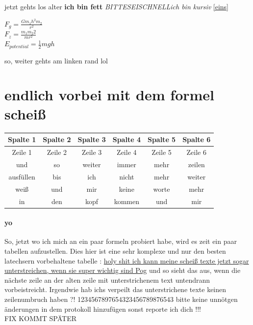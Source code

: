 \documentclass[a4paper]{scrartcl}
\begin{document}
				jetzt gehts los alter \textbf{ich bin fett}
				\emph{BITTESEISCHNELL}\textit{ich bin kursiv}
				\ref{eins}
				\linebreak[3]
				\\ \begin{center} \huge ${F}_{g}=\frac{G{m}_{1}h^2{m}_{2}}{{r}^{2}}$
				\linebreak[5]
				\\ {\color{red}${F}_{z}=\frac{{m}_{1}{m}_{2}{2}}{{}{m r}^{2}}$}
				\linebreak[5]
				\\$E_{potential}=\frac{{1}}{2}mgh$
				\linebreak[10]
				
				\end{center}
			
			so, weiter gehts am linken rand lol
		
		\section{endlich vorbei mit dem formel scheiß}
		\begin{tabular}{||c||c||c||c||c||c|}
	
			\hline 
			Spalte 1  & Spalte 2 & Spalte 3 & Spalte 4 & Spalte 5 & Spalte 6 \\ 
			\hline 
			Zeile 1  & Zeile 2  & Zeile 3  & Zeile 4 & Zeile 5 & Zeile 6 \\ 
			\hline 
			und  & so  & weiter  & immer  & mehr  & zeilen  \\ 
			\hline 
			ausfüllen & bis  & ich  & nicht  & mehr  & weiter \\ 
			\hline 
			weiß  & und  & mir  & keine  & worte  & mehr \\ 
			\hline 
			in  & den & kopf  & kommen  & und  & mir \\ 
			\hline
		\end{tabular} 
		
		\paragraph{yo}
		So, jetzt wo ich mich an ein paar formeln probiert habe, wird es zeit ein paar tabellen aufzustellen. Dies hier ist eine sehr komplexe und nur den besten latechsern vorbehaltene tabelle :
		\underline{holy shit ich kann meine scheiß texte jetzt sogar unterstreichen, wenn sie super wichtig sind Pog} und so sieht das aus, wenn die nächste zeile an der alten zeile mit
		 unterstrichenem text untendrann vorbeistreicht. Irgendwie hab ichs verpeilt das unterstrichene texte keinen zeilenumbruch haben ?!  1234567897654323456789876543 
		 \huge bitte keine unnötgen änderungen in dem protokoll hinzufügen sonst reporte ich dich !!!
		 \vspace{20pt}
		  \\ {\huge FIX KOMMT SPÄTER }
		  
\end{document}

